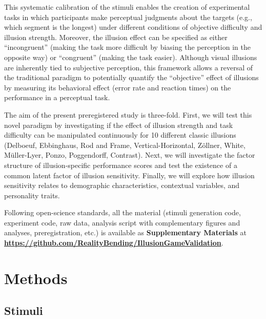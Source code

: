 \documentclass[
  man,floatsintext]{apa6}
\begin{document}
This systematic calibration of the stimuli enables the creation of experimental tasks in which participants make perceptual judgments about the targets (e.g., which segment is the longest) under different conditions of objective difficulty and illusion strength. Moreover, the illusion effect can be specified as either ``incongruent'' (making the task more difficult by biasing the perception in the opposite way) or ``congruent'' (making the task easier). Although visual illusions are inherently tied to subjective perception, this framework allows a reversal of the traditional paradigm to potentially quantify the ``objective'' effect of illusions by measuring its behavioral effect (error rate and reaction times) on the performance in a perceptual task.

The aim of the present preregistered study is three-fold. First, we will test this novel paradigm by investigating if the effect of illusion strength and task difficulty can be manipulated continuously for 10 different classic illusions (Delboeuf, Ebbinghaus, Rod and Frame, Vertical-Horizontal, Zöllner, White, Müller-Lyer, Ponzo, Poggendorff, Contrast). Next, we will investigate the factor structure of illusion-specific performance scores and test the existence of a common latent factor of illusion sensitivity. Finally, we will explore how illusion sensitivity relates to demographic characteristics, contextual variables, and personality traits.

Following open-science standards, all the material (stimuli generation code, experiment code, raw data, analysis script with complementary figures and analyses, preregistration, etc.) is available as \textbf{Supplementary Materials} at \href{https://github.com/RealityBending/IllusionGameValidation}{\textbf{https://github.com/RealityBending/IllusionGameValidation}}.

\hypertarget{methods}{%
\section{Methods}\label{methods}}

\hypertarget{stimuli}{%
\subsection{Stimuli}\label{stimuli}}
\end{document}
